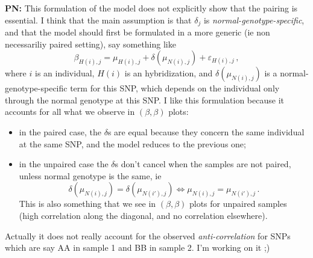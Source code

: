 \documentclass[10pt]{bmc_article}
\newenvironment{bmcformat}{\fussy\setboolean{publ}{true}}{\fussy}
\newcommand{\eps}{\varepsilon\xspace}
\newenvironment{TODO}{\color{red}\textbf{TODO:}}{}
\newenvironment{PN}{\color{blue}\textbf{PN:}}{}
\begin{document}
\begin{bmcformat}

\begin{PN}
  This formulation of the model does not explicitly show that the pairing is essential. I think that the main assumption is that $\delta_j$ is \emph{normal-genotype-specific}, and that the model should first be formulated in a more generic (ie non necessariliy paired setting), say something like
\begin{displaymath}
   \beta_{H(i),j} =  \mu_{H(i),j} + \delta(\mu_{N(i), j}) + \eps_{H(i),j} \,,
\end{displaymath}
where $i$ is an individual, $H(i)$ is an hybridization, and $\delta(\mu_{N(i), j})$ is a normal-genotype-specific term for this SNP, which depends on the individual only through the normal genotype at this SNP. I like this formulation because it accounts for all what we observe in $(\beta, \beta)$ plots:

\begin{itemize}
\item in the paired case, the $\delta$s are equal because they concern the same individual at the same SNP, and the model reduces to the previous one;
\item in the unpaired case the $\delta$s don't cancel when the samples are not paired, unless normal genotype is the same, ie 
\begin{displaymath}
  \delta(\mu_{N(i), j}) = \delta(\mu_{N(i'), j})  \iff \mu_{N(i), j}=\mu_{N(i'), j}\,.
\end{displaymath}
This is also something that we see in $(\beta, \beta)$ plots for unpaired samples (high correlation along the diagonal, and no correlation elsewhere). 
\end{itemize}
Actually it does not really account for the observed \emph{anti-correlation} for SNPs which are say AA in sample 1 and BB in sample 2. I'm working on it ;)
\end{PN}


\end{bmcformat}
\end{document}
